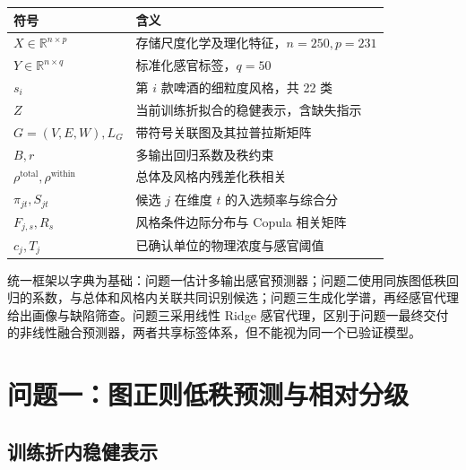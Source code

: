 \documentclass[
  chinese,
  11pt,
]{article}
\newcounter{none} %
\begin{document}
{\def\LTcaptype{none} %
\begin{longtable}[]{@{}
  >{\raggedright\arraybackslash}p{}
  >{\raggedright\arraybackslash}p{}@{}}
\toprule\noalign{}
\begin{minipage}[b]{\linewidth}\raggedright
符号
\end{minipage} & \begin{minipage}[b]{\linewidth}\raggedright
含义
\end{minipage} \\
\midrule\noalign{}
\endhead
\bottomrule\noalign{}
\endlastfoot
\(X\in\mathbb R^{n\times p}\) &
存储尺度化学及理化特征，\(n=250,p=231\) \\
\(Y\in\mathbb R^{n\times q}\) & 标准化感官标签，\(q=50\) \\
\(s_i\) & 第 \(i\) 款啤酒的细粒度风格，共 22 类 \\
\(Z\) & 当前训练折拟合的稳健表示，含缺失指示 \\
\(G=(V,E,W),L_G\) & 带符号关联图及其拉普拉斯矩阵 \\
\(B,r\) & 多输出回归系数及秩约束 \\
\(\rho^{\mathrm{total}},\rho^{\mathrm{within}}\) &
总体及风格内残差化秩相关 \\
\(\pi_{jt},S_{jt}\) & 候选 \(j\) 在维度 \(t\) 的入选频率与综合分 \\
\(F_{j,s},R_s\) & 风格条件边际分布与 Copula 相关矩阵 \\
\(c_j,T_j\) & 已确认单位的物理浓度与感官阈值 \\
\end{longtable}
}

统一框架以字典为基础：问题一估计多输出感官预测器；问题二使用同族图低秩回归的系数，与总体和风格内关联共同识别候选；问题三生成化学谱，再经感官代理给出画像与缺陷筛查。问题三采用线性
Ridge
感官代理，区别于问题一最终交付的非线性融合预测器，两者共享标签体系，但不能视为同一个已验证模型。

\section{问题一：图正则低秩预测与相对分级}\label{ux95eeux9898ux4e00ux56feux6b63ux5219ux4f4eux79e9ux9884ux6d4bux4e0eux76f8ux5bf9ux5206ux7ea7}

\subsection{训练折内稳健表示}\label{ux8badux7ec3ux6298ux5185ux7a33ux5065ux8868ux793a}
\end{document}
